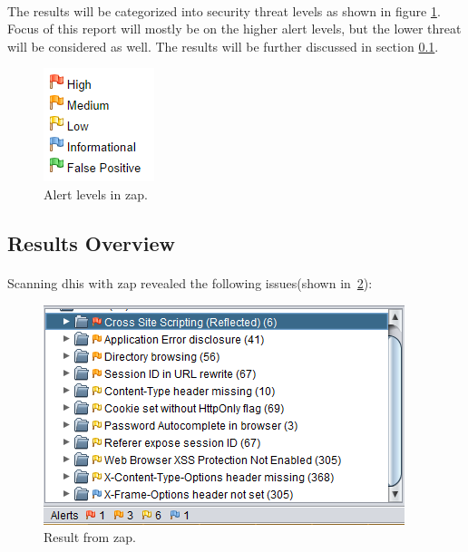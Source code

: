 \documentclass[11pt,english,a4paper]{report}
\begin{document}
\paragraph{}
The results will be categorized into security threat levels as shown in figure \ref{fig:zapalerts}.
Focus of this report will mostly be on the higher alert levels, but the lower threat will be considered as well.
The results will be further discussed in section \ref{sec:zapresult-overview}.

\begin{figure}[h]
    \centering
    \includegraphics[scale=0.65]{images/alerts.png}
    \caption{Alert levels in \gls{zap}.}
    \label{fig:zapalerts}
\end{figure}


\subsection{Results Overview}
\label{sec:zapresult-overview}
\paragraph{}
Scanning \gls{dhis} with \gls{zap} revealed the following issues(shown in~\ref{fig:zapresults}):

\begin{figure}[h]
    \centering
    \includegraphics[scale=0.65]{images/zap-result.png}
    \caption{Result from \gls{zap}.}
    \label{fig:zapresults}
\end{figure}
\end{document}
